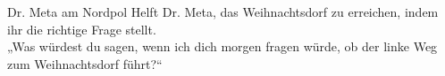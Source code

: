 \begin{frame}{Dr. Meta am Nordpol\textsuperscript{\thefootnote}}
		Helft Dr. Meta, das Weihnachtsdorf zu erreichen, indem ihr die richtige Frage stellt. %
	\\[1em]
	\impl „Was würdest du sagen, wenn ich dich morgen fragen würde, ob der linke Weg zum Weihnachtsdorf führt?“\\
	\bigskip
	
\end{frame}
